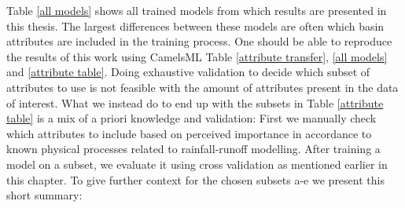 Table \ref{all models} shows all trained models from which results are presented in this 
thesis. The largest differences between these models are often which basin attributes 
are included in the training process. One should be able to reproduce the results 
of this work using CamelsML Table \ref{attribute transfer}, \ref{all models} and \ref{attribute table}. 
Doing exhaustive validation to decide which subset of attributes to use is not 
feasible with the amount of attributes present in the data of interest. What we instead 
do to end up with the subsets in Table \ref{attribute table} is a mix of a priori 
knowledge and validation: First we manually check which attributes to include based 
on perceived importance in accordance to known physical processes related to rainfall-runoff 
modelling. After training a model on a subset, we evaluate it using cross validation 
as mentioned earlier in this chapter. To give further context for the chosen subsets 
a-e we present this short summary:

